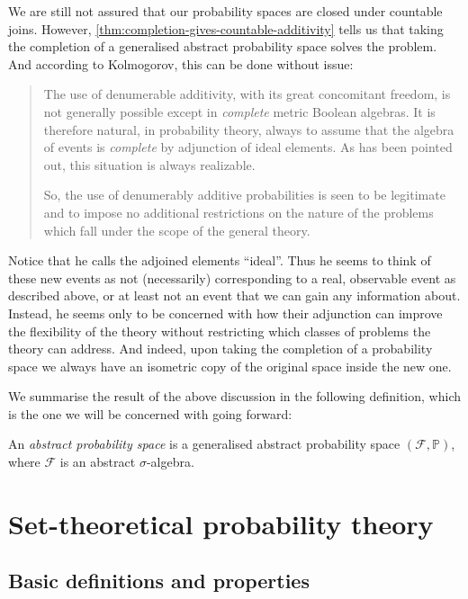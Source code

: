 \documentclass[article, a4paper, 11pt, oneside]{memoir}
\numberwithin{equation}{chapter}
\newcommand{\calF}{\mathcal{F}}
\renewcommand{\P}{\mathbb{P}}
\begin{document}
We are still not assured that our probability spaces are closed under countable joins. However, \cref{thm:completion-gives-countable-additivity} tells us that taking the completion of a generalised abstract probability space solves the problem. And according to Kolmogorov, this can be done without issue:
%
\newlength{\oldparindent}
\setlength{\oldparindent}{\parindent}
\blockquote[\cite{kolmogorov1995}]{\setlength{\parskip}{0pt}\setlength{\parindent}{\oldparindent}
    The use of denumerable additivity, with its great concomitant freedom, is not generally possible except in \emph{complete} metric Boolean algebras. It is therefore natural, in probability theory, always to assume that the algebra of events is \emph{complete} by adjunction of ideal elements. As has been pointed out, this situation is always realizable.

    So, the use of denumerably additive probabilities is seen to be legitimate and to impose no additional restrictions on the nature of the problems which fall under the scope of the general theory.
}
%
Notice that he calls the adjoined elements \enquote{ideal}. Thus he seems to think of these new events as not (necessarily) corresponding to a real, observable event as described above, or at least not an event that we can gain any information about. Instead, he seems only to be concerned with how their adjunction can improve the flexibility of the theory without restricting which classes of problems the theory can address. And indeed, upon taking the completion of a probability space we always have an isometric copy of the original space inside the new one.

We summarise the result of the above discussion in the following definition, which is the one we will be concerned with going forward:

\begin{definition}
    \label{def:abstract-probability-space}
    An \emph{abstract probability space} is a generalised abstract probability space $(\calF, \P)$, where $\calF$ is an abstract $\sigma$-algebra.
\end{definition}


\chapter{Set-theoretical probability theory}

\section{Basic definitions and properties}
\end{document}
